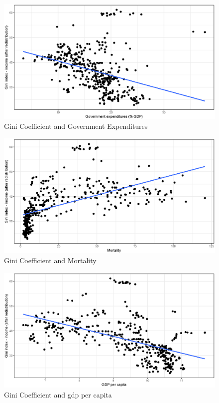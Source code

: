 \documentclass[a4paper,11pt]{article}
\begin{document}
\begin{figure}
    \caption{Gini Coefficient and Government Expenditures}
    \label{fig:ginigovexp}
\includegraphics[width=\textwidth, keepaspectratio]{figures/GovExpGiniNet}
\end{figure}

\begin{figure}
    \caption{Gini Coefficient and Mortality}
    \label{fig:ginimort}
\includegraphics[width=\textwidth, keepaspectratio]{figures/MortGiniNet}
\end{figure}

\begin{figure}
    \caption{Gini Coefficient and \ac{gdp} per capita}
    \label{fig:ginigdp}
\includegraphics[width=\textwidth, keepaspectratio]{figures/GDPGiniNet}
\end{figure}
\end{document}
